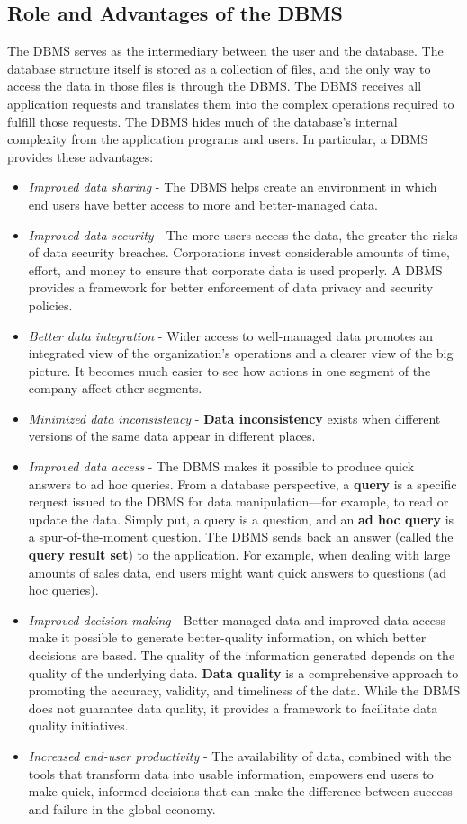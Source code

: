 \documentclass[a4paper, 12pt, titlepage]{report}
\begin{document}
\subsection{Role and Advantages of the DBMS}
The DBMS serves as the intermediary between the user and the database. The database structure itself is stored as a collection of files, and the only way to access the data in those files is through the DBMS. The DBMS receives all application requests and translates them into the complex operations required to fulfill those requests. The DBMS hides much of the database’s internal complexity from the application programs and users.
\noindent In particular, a DBMS provides these advantages:
\begin{itemize}
\item \emph{Improved data sharing} - The DBMS helps create an environment in which end users have better access to more and better-managed data.
\item \emph{Improved data security} - The more users access the data, the greater the risks of data security breaches. Corporations invest considerable amounts of time, effort, and money to ensure that corporate data is used properly. A DBMS provides a framework for better enforcement of data privacy and security policies.
\item \emph{Better data integration} - Wider access to well-managed data promotes an integrated view of the organization’s operations and a clearer view of the big picture. It becomes much easier to see how actions in one segment of the company affect other segments.
\item \emph{Minimized data inconsistency} - \textbf{Data inconsistency} exists when different versions of the same data appear in different places.
\item \emph{Improved data access} - The DBMS makes it possible to produce quick answers to ad hoc queries. From a database perspective, a \textbf{query} is a specific request issued to the DBMS for data manipulation—for example, to read or update the data. Simply put, a query is a question, and an \textbf{ad hoc query} is a spur-of-the-moment question. The DBMS sends back an answer (called the \textbf{query result set}) to the application. For example, when dealing with large amounts of sales data, end users might want quick answers to questions (ad hoc queries).
\item \emph{Improved decision making} - Better-managed data and improved data access make it possible to generate better-quality information, on which better decisions are based. The quality of the information generated depends on the quality of the underlying data. \textbf{Data quality} is a comprehensive approach to promoting the accuracy, validity, and timeliness of the data. While the DBMS does not guarantee data quality, it provides a framework to facilitate data quality initiatives.
\item \emph{Increased end-user productivity} - The availability of data, combined with the tools that transform data into usable information, empowers end users to make quick, informed decisions that can make the difference between success and failure in the global economy.
\end{itemize}
\end{document}
